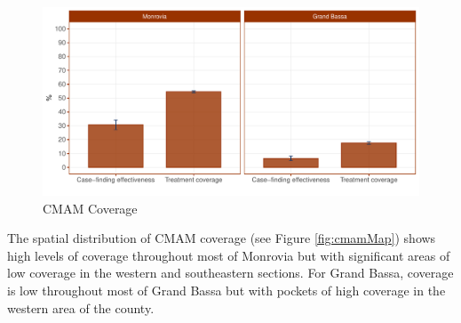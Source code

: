 \documentclass[12pt,a4paper]{article}
\begin{document}
\begin{figure}[H]

{\centering \includegraphics{liberiaCoverageReport_files/figure-latex/cmam1-1} 

}

\caption{CMAM Coverage}\label{fig:cmam1}
\end{figure}

\begin{table}[H]

\caption{\label{tab:cmam2}CMAM coverage}
\centering
{}
\end{table}

The spatial distribution of CMAM coverage (see Figure \ref{fig:cmamMap}) shows high levels of coverage throughout most of Monrovia but with significant areas of low coverage in the western and southeastern sections. For Grand Bassa, coverage is low throughout most of Grand Bassa but with pockets of high coverage in the western area of the county.
\end{document}
